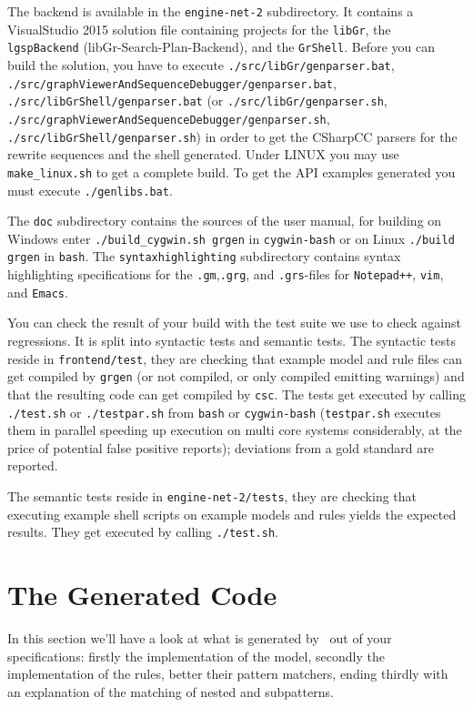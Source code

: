 The backend is available in the \texttt{engine-net-2} subdirectory. 
It contains a VisualStudio 2015 solution file containing projects for the \texttt{libGr}, the \texttt{lgspBackend} (libGr-Search-Plan-Backend), and the \texttt{GrShell}.
Before you can build the solution, you have to execute \texttt{./src/lib\-Gr/gen\-parser.bat}, \texttt{./src/graph\-Viewer\-And\-Sequence\-Debugger/gen\-parser.bat}, \texttt{./src/lib\-Gr\-Shell/gen\-parser.bat} (or \texttt{./src/lib\-Gr/gen\-parser.sh}, \texttt{./src/graph\-Viewer\-And\-Sequence\-Debugger/gen\-parser.sh}, \texttt{./src/lib\-Gr\-Shell/gen\-parser.sh}) in order to get the CSharpCC parsers for the rewrite sequences and the shell generated.
Under LINUX you may use \texttt{make\_linux.sh} to get a complete build.
To get the API examples generated you must execute \texttt{./genlibs.bat}.

The \texttt{doc} subdirectory contains the sources of the user manual, for building on Windows enter \texttt{./build\_cygwin.sh grgen} in \texttt{cygwin-bash} or on Linux \texttt{./build grgen} in \texttt{bash}.
The \texttt{syntaxhighlighting} subdirectory contains syntax highlighting specifications for the \texttt{.gm},\texttt{.grg}, and \texttt{.grs}-files for \texttt{Notepad++}, \texttt{vim}, and \texttt{Emacs}.

You can check the result of your build with the test suite we use to check against regressions.
It is split into syntactic tests and semantic tests. 
The syntactic tests reside in \texttt{frontend/test}, they are checking that example model and rule files can get compiled by \texttt{grgen} (or not compiled, or only compiled emitting warnings) and that the resulting code can get compiled by \texttt{csc}.
The tests get executed by calling \texttt{./test.sh} or \texttt{./testpar.sh} from \texttt{bash} or \texttt{cygwin-bash} (\texttt{testpar.sh} executes them in parallel speeding up execution on multi core systems considerably, at the price of potential false positive reports); deviations from a gold standard are reported.

The semantic tests reside in \texttt{engine-net-2/tests}, they are checking that executing example shell scripts on example models and rules yields the expected results. 
They get executed by calling \texttt{./test.sh}.


\section{The Generated Code}\label{sec:generatedcode}
In this section we'll have a look at what is generated by \GrG~out of your specifications: firstly the implementation of the model, secondly the implementation of the rules, better their pattern matchers, ending thirdly with an explanation of the matching of nested and subpatterns.

